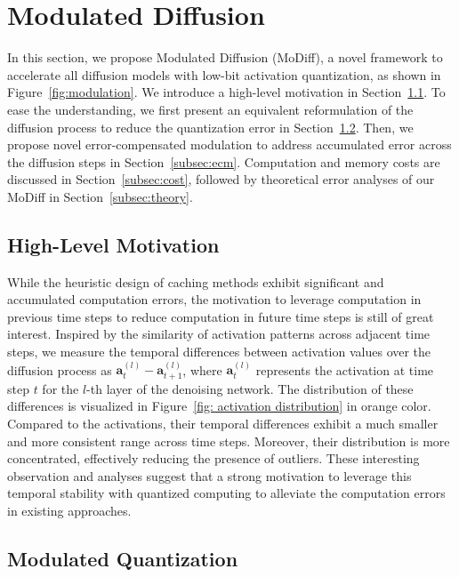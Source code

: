 \section{Modulated Diffusion}
\label{sec:method}

In this section, we propose Modulated Diffusion (MoDiff), a novel framework to accelerate all diffusion models with low-bit activation quantization, as shown in Figure~\ref{fig:modulation}. We introduce a high-level motivation in Section~\ref{subsec:motivation}. To ease the understanding, we first present an equivalent reformulation of the diffusion process to reduce the quantization error in Section~\ref{subsec:modm}. Then, we propose novel error-compensated modulation to address accumulated error across the diffusion steps in Section~\ref{subsec:ecm}. Computation and memory costs are discussed in Section~\ref{subsec:cost}, followed by theoretical error analyses of our MoDiff in Section~\ref{subsec:theory}. 

\subsection{High-Level Motivation}
\label{subsec:motivation}
While the heuristic design of caching methods exhibit significant and accumulated computation errors, the motivation to leverage computation in previous time steps to reduce computation in future time steps is still of great interest. Inspired by the similarity of activation patterns across adjacent time steps, we measure the temporal differences between activation values over the diffusion process as \(\mathbf{a}_t^{(l)} - \mathbf{a}_{t+1}^{(l)}\), where \(\mathbf{a}_t^{(l)}\) represents the activation at time step \(t\) for the \(l\)-th layer of the denoising network. The distribution of these differences is visualized in Figure~\ref{fig: activation distribution} in orange color. Compared to the activations, their temporal differences exhibit a much smaller and more consistent range across time steps. Moreover, their distribution is more concentrated, effectively reducing the presence of outliers. These interesting observation and analyses suggest that a strong motivation to leverage this temporal stability with quantized computing to alleviate the computation errors in existing approaches.

\subsection{Modulated Quantization}
\label{subsec:modm}


